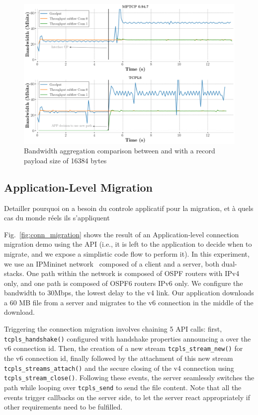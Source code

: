 \begin{figure}[!t]
  \begin{center}
    \includegraphics[width=\columnwidth]{figures/aggregate_dual.png}
  \end{center} 
  \caption{Bandwidth aggregation comparison between \mptcp and
    \tcpls with a record payload size of 16384 bytes}
  \label{fig:multipath_aggregation}
\end{figure}

\subsection{Application-Level Migration}


Detailler pourquoi on a besoin du controle applicatif pour la migration, et à
quels cas du monde réels ils s'appliquent


Fig.~\ref{fig:conn_migration} shows the result of an Application-level
connection migration demo using the API (i.e., it is left to the
application to decide when to migrate, and we expose a simplistic code flow to
perform it). In this experiment, we use an IPMininet network~\cite{ipmininet, jadin2020educational} 
composed of a client and a server, both dual-stacks. One path within the
network is composed of OSPF routers with IPv4 only, and one path is composed of
OSPF6 routers IPv6 only. We configure the bandwidth to 30Mbps, the lowest delay
to the v4 link. Our application downloads a 60 MB file from a server and migrates to the v6 connection in the middle of the download.

Triggering the connection migration involves chaining 5 API calls:
first, \texttt{tcpls\_handshake()} configured with handshake properties announcing a \join over the v6 connection id. Then, the creation of a new stream
\texttt{tcpls\_stream\_new()} for the v6 connection id, finally followed by the attachment of this new stream \texttt{tcpls\_streams\_attach()} and the secure closing of the v4 \tcp connection using \texttt{tcpls\_stream\_close()}. Following these events, the server seamlessly switches the path while looping over \texttt{tcpls\_send} to send the file content. Note that all the events trigger callbacks on the server side, to let the server react appropriately if other requirements need to be fulfilled.

